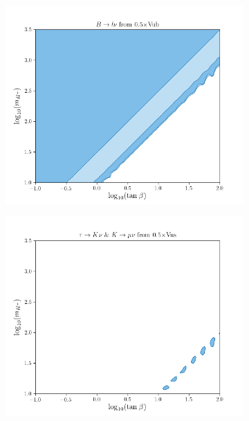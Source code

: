 \documentclass[11pt]{article}
\begin{document}
\begin{figure}[H]
    \centering
    \begin{subfigure}[b]{0.45\textwidth}
        \includegraphics[width=\textwidth]{vub/Blnu0.5.png}
    \end{subfigure}
    \begin{subfigure}[b]{0.45\textwidth}
        \includegraphics[width=\textwidth]{vus/Klnu0.5.png}
    \end{subfigure}
    \begin{subfigure}[b]{0.45\textwidth}

\end{subfigure}
\end{figure}
\end{document}

